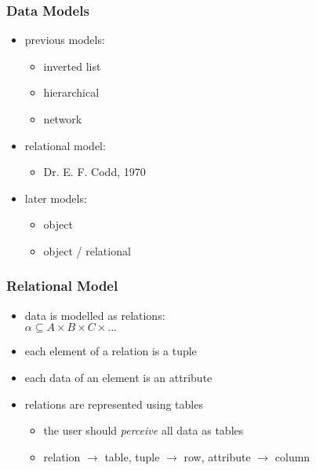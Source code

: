 \documentclass[dvipsnames]{beamer}
\theoremstyle{plain}
\begin{document}
\begin{frame}
  \frametitle{Data Models}

  \begin{itemize}
    \item previous models:
    \begin{itemize}
      \item inverted list
      \item hierarchical
      \item network
    \end{itemize}

    \pause
    \item relational model:
    \begin{itemize}
      \item Dr. E. F. Codd, 1970
    \end{itemize}

    \pause
    \item later models:
    \begin{itemize}
      \item object
      \item object / relational
    \end{itemize}
  \end{itemize}
\end{frame}

\begin{frame}
  \frametitle{Relational Model}

  \begin{itemize}
    \item data is modelled as \alert{relations}:\\
      $\alpha \subseteq A \times B \times C \times ...$

    \pause
    \medskip
    \item each element of a relation is a \alert{tuple}
    \item each data of an element is an \alert{attribute}

    \pause
    \medskip
    \item relations are represented using tables
    \begin{itemize}
      \item the user should \emph{perceive} all data as tables
      \item relation $\rightarrow$ table, tuple $\rightarrow$ row,
        attribute $\rightarrow$ column
    \end{itemize}
  \end{itemize}
\end{frame}
\end{document}
